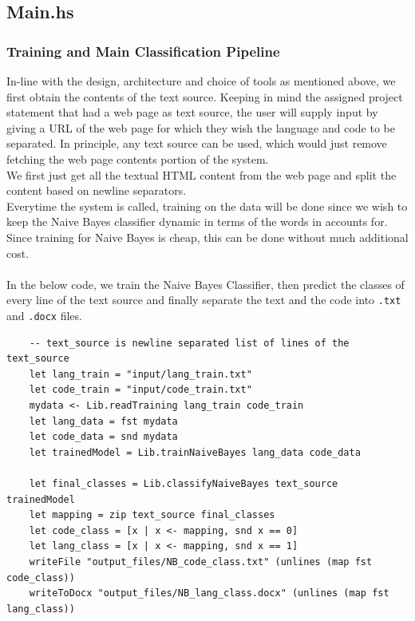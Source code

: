 \documentclass[12pt]{scrreprt}
\newcommand{\ttt}[1]{\texttt{#1}}
\begin{document}


\subsection{Main.hs}

\subsubsection{Training and Main Classification Pipeline}

In-line with the design, architecture and choice of tools as mentioned above, we first obtain the contents of the text source. Keeping in mind the assigned project statement that had a web page as text source, the user will supply input by giving a URL of the web page for which they wish the language and code to be separated. In principle, any text source can be used, which would just remove fetching the web page contents portion of the system. \\ 
We first just get all the textual HTML content from the web page and split the content based on newline separators. \\ Everytime the system is called, training on the data will be done since we wish to keep the Naive Bayes classifier dynamic in terms of the words in accounts for. Since training for Naive Bayes is cheap, this can be done without much additional cost.\\
\\ In the below code, we train the Naive Bayes Classifier, then predict the classes of every line of the text source and finally separate the text and the code into \ttt{.txt} and \ttt{.docx} files.

\begin{verbatim}
    -- text_source is newline separated list of lines of the text_source
    let lang_train = "input/lang_train.txt"
    let code_train = "input/code_train.txt"
    mydata <- Lib.readTraining lang_train code_train
    let lang_data = fst mydata
    let code_data = snd mydata
    let trainedModel = Lib.trainNaiveBayes lang_data code_data

    let final_classes = Lib.classifyNaiveBayes text_source trainedModel
    let mapping = zip text_source final_classes
    let code_class = [x | x <- mapping, snd x == 0]
    let lang_class = [x | x <- mapping, snd x == 1]
    writeFile "output_files/NB_code_class.txt" (unlines (map fst code_class))
    writeToDocx "output_files/NB_lang_class.docx" (unlines (map fst lang_class))
   \end{verbatim}
   
\end{document}
